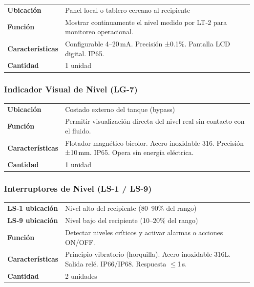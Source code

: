 \documentclass[12pt,letterpaper]{article}
\begin{document}
\begin{especbox}[title={LI-2 — Siemens SITRANS RD100}]
\renewcommand{\arraystretch}{1.25}
\begin{tabular}{L{4cm} L{9.5cm}}
\textbf{Ubicación}       & Panel local o tablero cercano al recipiente \\
\textbf{Función}         & Mostrar continuamente el nivel medido por LT-2 para monitoreo operacional. \\
\textbf{Características} & Configurable 4--20\,mA. Precisión ±0.1\%. Pantalla LCD digital. IP65. \\
\textbf{Cantidad}        & 1 unidad \\
\end{tabular}
\end{especbox}

\subsubsection{Indicador Visual de Nivel (LG-7)}

\begin{especbox}[title={LG-7 — Kobold BNA Magnetic Level Indicator}]
\renewcommand{\arraystretch}{1.25}
\begin{tabular}{L{4cm} L{9.5cm}}
\textbf{Ubicación}       & Costado externo del tanque (bypass) \\
\textbf{Función}         & Permitir visualización directa del nivel real sin contacto con el fluido. \\
\textbf{Características} & Flotador magnético bicolor. Acero inoxidable 316. Precisión ±10\,mm. IP65. Opera sin energía eléctrica. \\
\textbf{Cantidad}        & 1 unidad \\
\end{tabular}
\end{especbox}

\subsubsection{Interruptores de Nivel (LS-1 / LS-9)}

\begin{especbox}[title={LS-1/LS-9 — VEGA VEGASWING 63}]
\renewcommand{\arraystretch}{1.25}
\begin{tabular}{L{4cm} L{9.5cm}}
\textbf{LS-1 ubicación}  & Nivel alto del recipiente (80--90\% del rango) \\
\textbf{LS-9 ubicación}  & Nivel bajo del recipiente (10--20\% del rango) \\
\textbf{Función}         & Detectar niveles críticos y activar alarmas o acciones ON/OFF. \\
\textbf{Características} & Principio vibratorio (horquilla). Acero inoxidable 316L. Salida relé. IP66/IP68. Respuesta $\leq$1\,s. \\
\textbf{Cantidad}        & 2 unidades \\
\end{tabular}
\end{especbox}
\end{document}
